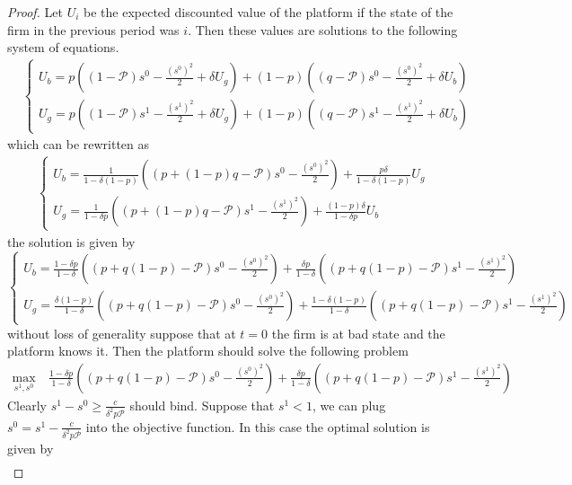 \documentclass[a4paper]{article}
\begin{document}
\begin{proof}
	Let $U_i$ be the expected discounted value of the platform if the state of the firm in the previous period was $i$. Then these values are solutions to the following system of equations. 
	\begin{align*}
	&\begin{cases}
	U_b = p\left((1-\mathcal{P})s^0 - \frac{(s^0)^2}{2} + \delta U_g\right) + (1-p)\left((q - \mathcal{P})s^0 - \frac{(s^0)^2}{2} + \delta U_b \right)\\
	U_g = p\left((1- \mathcal{P})s^1 - \frac{(s^1)^2}{2} + \delta U_g\right) + (1-p)\left((q - \mathcal{P})s^1 - \frac{(s^1)^2}{2} + \delta U_b \right)
	\end{cases} 
	\end{align*}
	which can be rewritten as
	\begin{align*}
	\begin{cases}
	U_b = \frac{1}{1 - \delta(1-p)} \left( (p + (1-p)q - \mathcal{P})s^0 - \frac{(s^0)^2}{2} \right) + \frac{p\delta}{1 - \delta(1-p)}U_g\\
	U_g = \frac{1}{1 - \delta p} \left( (p + (1-p)q - \mathcal{P})s^1 - \frac{(s^1)^2}{2} \right) + \frac{(1-p)\delta}{1 - \delta p}U_b
	\end{cases}
	\end{align*}
	the solution is given by
	$$\begin{cases}
	U_b = \frac{1-\delta p}{1-\delta}\left((p + q(1-p) - \mathcal{P})s^0 - \frac{(s^0)^2}{2}\right) + \frac{\delta p}{1-\delta}\left((p + q(1-p) - \mathcal{P})s^1 - \frac{(s^1)^2}{2}\right)\\
	U_g = \frac{\delta (1-p)}{1-\delta}\left((p + q(1-p) - \mathcal{P})s^0 - \frac{(s^0)^2}{2}\right) +\frac{1-\delta(1- p)}{1-\delta}\left((p + q(1-p) - \mathcal{P})s^1 - \frac{(s^1)^2}{2}\right)
	\end{cases}$$
	without loss of generality suppose that at $t = 0$ the firm is at bad state and the platform knows it. Then the platform should solve the following problem
	\begin{align*}
	\underset{s^1, s^0}{\max}&\ \frac{1-\delta p}{1-\delta}\left((p + q(1-p) - \mathcal{P})s^0 - \frac{(s^0)^2}{2}\right) + \frac{\delta p}{1-\delta}\left((p + q(1-p) - \mathcal{P})s^1 - \frac{(s^1)^2}{2}\right)
	\end{align*}
	Clearly $s^1 - s^0 \ge \frac{c}{\delta^2 p \mathcal{P}}$ should bind. Suppose that $s^1 < 1$, we can plug $s^0 = s^1 - \frac{c}{\delta^2 p \mathcal{P}}$ into the objective function. In this case the optimal solution is given by \begin{align}\label{eq2}

\end{align}
\end{proof}
\end{document}
